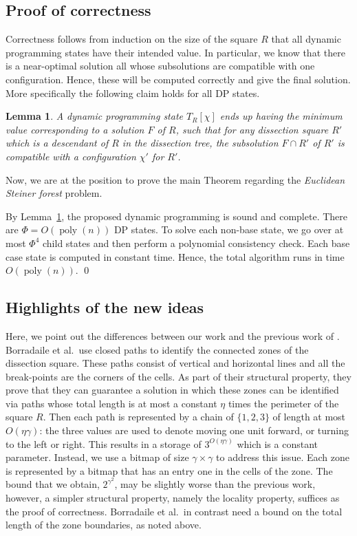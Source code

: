 \documentclass[extras,11pt]{article} \usepackage{fullpage}
\theoremstyle{mytheorem}
\newtheorem{lemma}[theorem]{Lemma}
\newenvironment{proofof}[1]{\par\noindent{\bf #1.}\hspace{0.5em}}
    {\hfill\qed\vspace{1ex}}
\DeclareMathOperator{\poly}{poly}
\newcommand{\prob}[1]{\textit{#1}}
\begin{document}
\subsection{Proof of correctness}
Correctness follows from induction on the size of the square $R$ that all dynamic programming states have their intended value.
In particular, we know that there is a near-optimal solution all whose subsolutions are compatible with one configuration.
Hence, these will be computed correctly and give the final solution.
More specifically the following claim holds for all DP states.
\begin{lemma}\label{lem:dp-sf}
A dynamic programming state $T_{R}[\chi]$ ends up having the minimum value corresponding to a solution $F$ of $R$, such that for any dissection square $R'$ which is a descendant of $R$ in the dissection tree, the subsolution $F\cap R'$ of $R'$ is compatible with a configuration $\chi'$ for $R'$.
\end{lemma}



Now, we are at the position to prove the main Theorem regarding the \prob{Euclidean Steiner forest} problem.
\begin{proofof}{\proofname\ of Theorem~\ref{thm:sf}}
By Lemma~\ref{lem:dp-sf}, the proposed dynamic programming is sound and complete.
There are $\Phi=O(\poly(n))$ DP states.
To solve each non-base state, we go over at most $\Phi^4$ child states and then perform a polynomial consistency check.
Each base case state is computed in constant time.
Hence, the total algorithm runs in time $O(\poly(n))$.
\end{proofof}







\subsection{Highlights of the new ideas}\label{sec:newideas}
Here, we point out the differences between our work and the previous work of \cite{BKM08:euc-for}.
Borradaile et al.\ use closed paths to identify the connected zones of the dissection square.
These paths consist of vertical and horizontal lines and all the break-points are the corners of the cells.
As part of their structural property, they prove that they can guarantee a solution in which these zones can be identified via paths whose total length is at most a constant $\eta$ times the perimeter of the square $R$.
Then each path is represented by a chain of $\{1,2,3\}$ of length at most $O(\eta\gamma)$: the three values are used to denote moving one unit forward, or turning to the left or right.  This results in a storage of $3^{O(\eta\gamma)}$ which is a constant parameter.
Instead, we use a bitmap of size $\gamma\times\gamma$ to address this issue.
Each zone is represented by a bitmap that has an entry one in the cells of the zone.
The bound that we obtain, $2^{\gamma^2}$, may be slightly worse than the previous work, however,
a simpler structural property, namely the locality property, suffices as the proof of correctness.
Borradaile et al.\ in contrast need a bound on the total length of the zone boundaries, as noted above.
\end{document}
